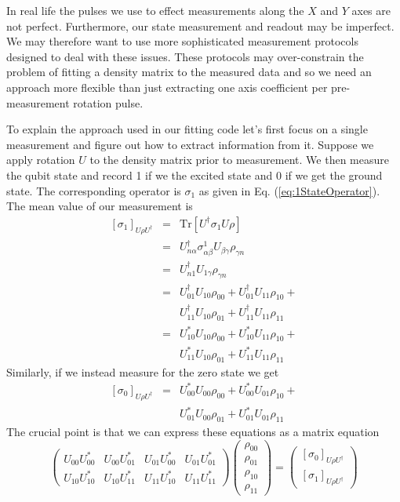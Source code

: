 \documentclass[twocolumn,english,aps,prl]{revtex4}
\begin{document}
In real life the pulses we use to effect measurements along the $X$ and $Y$ axes are not perfect. Furthermore, our state measurement and readout may be imperfect. We may therefore want to use more sophisticated measurement protocols designed to deal with these issues. These protocols may over-constrain the problem of fitting a density matrix to the measured data and so we need an approach more flexible than just extracting one axis coefficient per pre-measurement rotation pulse.

To explain the approach used in our fitting code let's first focus on a single measurement and figure out how to extract information from it. Suppose we apply rotation $U$ to the density matrix prior to measurement. We then measure the qubit state and record 1 if we the excited state and 0 if we get the ground state. The corresponding operator is $\sigma_1$ as given in Eq. (\ref{eq:1StateOperator}). The mean value of our measurement is \begin{eqnarray}
\left[ \sigma_1 \right] _{U \rho U^{\dagger}} &=& \textrm{Tr} \left[ U^{\dagger} \sigma_1 U \rho \right] \\
&=& U_{n \alpha}^{\dagger} \sigma^1_{\alpha\beta}U_{\beta \gamma}\rho_{\gamma n} \\
&=& U_{n1}^{\dagger} U_{1 \gamma} \rho_{\gamma n} \\
&=& U_{01}^{\dagger} U_{10} \rho_{00} + U_{01}^{\dagger} U_{11} \rho_{10} + \\
& & U_{11}^{\dagger} U_{10} \rho_{01} + U_{11}^{\dagger} U_{11} \rho_{11} \\
&=& U_{10}^* U_{10} \rho_{00} + U_{10}^* U_{11} \rho_{10} + \\
& & U_{11}^* U_{10} \rho_{01} + U_{11}^* U_{11} \rho_{11} \end{eqnarray}
Similarly, if we instead measure for the zero state we get \begin{eqnarray}
\left[ \sigma_0 \right]_{U \rho U^{\dagger}} &=& U_{00}^* U_{00} \rho_{00} + U_{00}^* U_{01} \rho_{10} + \nonumber \\
& & U_{01}^* U_{00} \rho_{01} + U_{01}^* U_{01} \rho_{11} \end{eqnarray}
The crucial point is that we can express these equations as a matrix equation \begin{equation}
\left( \begin{array}{cccc}
U_{00}U_{00}^* & U_{00}U_{01}^* & U_{01}U_{00}^* & U_{01}U_{01}^* \\
U_{10}U_{10}^* & U_{10}U_{11}^* & U_{11}U_{10}^* & U_{11}U_{11}^*
\end{array} \right) \left( \begin{array}{c}
\rho_{00} \\ \rho_{01} \\ \rho_{10} \\ \rho_{11} \end{array} \right) = 
\left( \begin{array}{c} \left[\sigma_0 \right]_{U \rho U^{\dagger}} \\ \left[ \sigma_1 \right]_{U \rho U^{\dagger}} \end{array} \right)
\end{equation}
\end{document}
